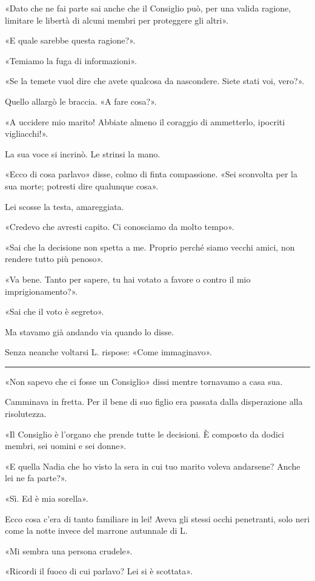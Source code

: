 \documentclass[a4paper,10pt]{memoir}
\begin{document}
«Dato che ne fai parte sai anche che il Consiglio può, per una valida ragione, limitare le libertà di alcuni membri per
proteggere gli altri».

«E quale sarebbe questa ragione?».

«Temiamo la fuga di informazioni».

«Se la temete vuol dire che avete qualcosa da nascondere. Siete stati voi, vero?».

Quello allargò le braccia. «A fare cosa?».

«A uccidere mio marito! Abbiate almeno il coraggio di ammetterlo, ipocriti vigliacchi!».

La sua voce si incrinò. Le strinsi la mano.

«Ecco di cosa parlavo» disse, colmo di finta compassione. «Sei sconvolta per la sua morte; potresti dire qualunque
cosa».

Lei scosse la testa, amareggiata.

«Credevo che avresti capito. Ci conosciamo da molto tempo».

«Sai che la decisione non spetta a me. Proprio perché siamo vecchi amici, non rendere tutto più penoso».

«Va bene. Tanto per sapere, tu hai votato a favore o contro il mio imprigionamento?».

«Sai che il voto è segreto».

Ma stavamo già andando via quando lo disse.

Senza neanche voltarsi L. rispose: «Come immaginavo».

\plainbreak{1}

«Non sapevo che ci fosse un Consiglio» dissi mentre tornavamo a casa sua.

Camminava in fretta. Per il bene di suo figlio era passata dalla disperazione alla risolutezza.

«Il Consiglio è l'organo che prende tutte le decisioni. È composto da dodici membri, sei uomini e sei donne».

«E quella Nadia che ho visto la sera in cui tuo marito voleva andarsene? Anche lei ne fa parte?».

«Sì. Ed è mia sorella».

Ecco cosa c'era di tanto familiare in lei! Aveva gli stessi occhi penetranti, solo neri come la notte invece del marrone
autunnale di L.

«Mi sembra una persona crudele».

«Ricordi il fuoco di cui parlavo? Lei si è scottata».
\end{document}
